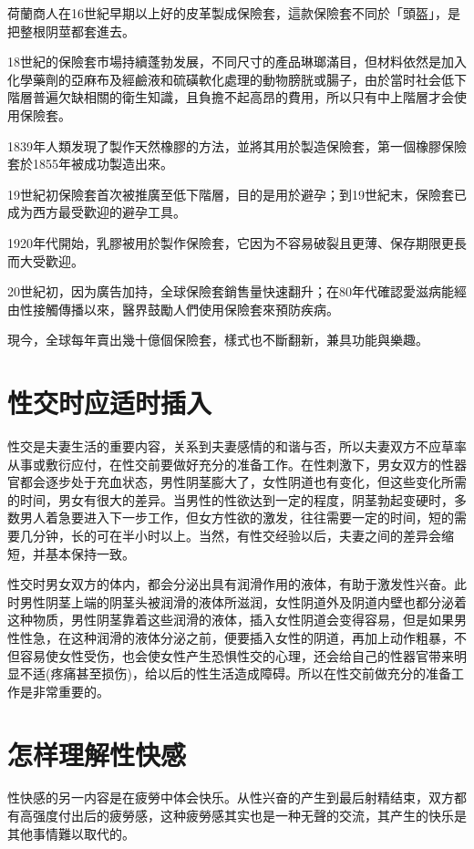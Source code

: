 \documentclass[12pt,UTF8]{ctexbook}
\begin{document}
荷蘭商人在16世紀早期以上好的皮革製成保險套，這款保險套不同於「頭盔」，是把整根阴莖都套進去。

18世紀的保險套市場持續蓬勃发展，不同尺寸的產品琳瑯滿目，但材料依然是加入化學藥劑的亞麻布及經鹼液和硫磺軟化處理的動物膀胱或腸子，由於當时社会低下階層普遍欠缺相關的衛生知識，且負擔不起高昂的費用，所以只有中上階層才会使用保險套。

1839年人類发現了製作天然橡膠的方法，並將其用於製造保險套，第一個橡膠保險套於1855年被成功製造出來。

19世紀初保險套首次被推廣至低下階層，目的是用於避孕；到19世紀末，保險套已成为西方最受歡迎的避孕工具。

1920年代開始，乳膠被用於製作保險套，它因为不容易破裂且更薄、保存期限更長而大受歡迎。

20世紀初，因为廣告加持，全球保險套銷售量快速翻升；在80年代確認愛滋病能經由性接觸傳播以來，醫界鼓勵人們使用保險套來預防疾病。

現今，全球每年賣出幾十億個保險套，樣式也不斷翻新，兼具功能與樂趣。



\section{性交时应适时插入}

性交是夫妻生活的重要内容，关系到夫妻感情的和谐与否，所以夫妻双方不应草率从事或敷衍应付，在性交前要做好充分的准备工作。在性刺激下，男女双方的性器官都会逐步处于充血状态，男性阴茎膨大了，女性阴道也有变化，但这些变化所需的时间，男女有很大的差异。当男性的性欲达到一定的程度，阴茎勃起变硬时，多数男人着急要进入下一步工作，但女方性欲的激发，往往需要一定的时间，短的需要几分钟，长的可在半小时以上。当然，有性交经验以后，夫妻之间的差异会缩短，并基本保持一致。

性交时男女双方的体内，都会分泌出具有润滑作用的液体，有助于激发性兴奋。此时男性阴茎上端的阴茎头被润滑的液体所滋润，女性阴道外及阴道内壁也都分泌着这种物质，男性阴茎靠着这些润滑的液体，插入女性阴道会变得容易，但是如果男性性急，在这种润滑的液体分泌之前，便要插入女性的阴道，再加上动作粗暴，不但容易使女性受伤，也会使女性产生恐惧性交的心理，还会给自己的性器官带来明显不适(疼痛甚至损伤)，给以后的性生活造成障碍。所以在性交前做充分的准备工作是非常重要的。

\section{怎样理解性快感}

性快感的另一内容是在疲勞中体会快乐。从性兴奋的产生到最后射精结束，双方都有高强度付出后的疲勞感，这种疲勞感其实也是一种无聲的交流，其产生的快乐是其他事情難以取代的。
\end{document}
